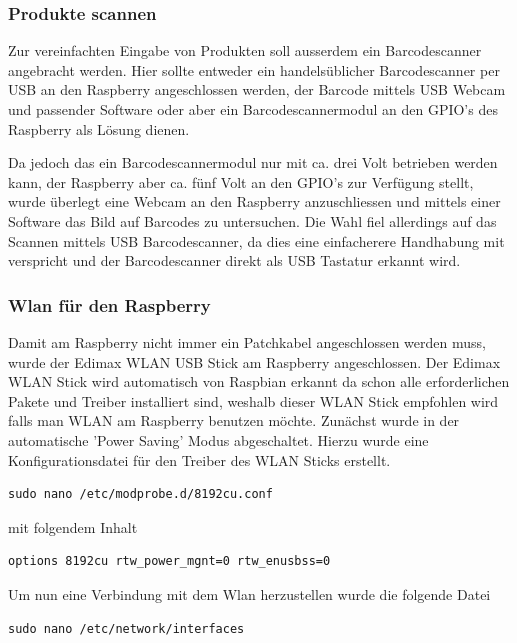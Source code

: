 \documentclass[11pt,a4paper]{article} %
\begin{document}
\subsubsection{Produkte scannen}
Zur vereinfachten Eingabe von Produkten soll ausserdem ein Barcodescanner angebracht werden. Hier sollte entweder ein handelsüblicher Barcodescanner per USB an den Raspberry angeschlossen werden, der Barcode mittels USB Webcam und passender Software oder aber ein Barcodescannermodul an den GPIO's des Raspberry als Lösung dienen.
\par
 Da jedoch das ein Barcodescannermodul nur mit ca. drei Volt betrieben werden kann, der Raspberry aber ca. fünf Volt an den GPIO's zur Verfügung stellt, wurde überlegt eine Webcam an den Raspberry anzuschliessen und mittels einer Software das Bild auf Barcodes zu untersuchen. Die Wahl fiel allerdings auf das Scannen mittels USB Barcodescanner, da dies eine einfacherere Handhabung mit verspricht und der Barcodescanner direkt als USB Tastatur erkannt wird.
\par
\subsubsection{Wlan für den Raspberry}
Damit am Raspberry nicht immer ein Patchkabel angeschlossen werden muss, wurde der Edimax WLAN USB Stick am Raspberry angeschlossen. Der Edimax WLAN Stick wird automatisch von Raspbian erkannt da schon alle erforderlichen Pakete und Treiber installiert sind, weshalb dieser WLAN Stick empfohlen wird falls man WLAN am Raspberry benutzen möchte. Zunächst wurde in der automatische 'Power Saving' Modus abgeschaltet. 
\newpage
Hierzu wurde eine Konfigurationsdatei für den Treiber des WLAN Sticks erstellt.
\begin{frame}

\begin{lstlisting}
sudo nano /etc/modprobe.d/8192cu.conf
\end{lstlisting}

\end{frame}
\par

mit folgendem Inhalt
\begin{frame}

\begin{lstlisting}
options 8192cu rtw_power_mgnt=0 rtw_enusbss=0
\end{lstlisting}

\end{frame}
\par
\par
Um nun eine Verbindung mit dem Wlan herzustellen wurde die folgende Datei
\begin{frame}

\begin{lstlisting}
sudo nano /etc/network/interfaces
\end{lstlisting}

\end{frame}
\end{document}
